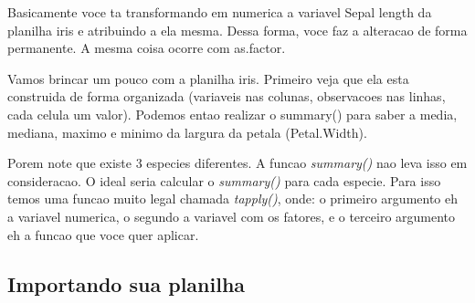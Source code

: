 \documentclass[
]{book}
\newenvironment{Shaded}{\begin{snugshade}}{\end{snugshade}}
\newcommand{\CommentTok}[1]{\textcolor[rgb]{0.56,0.35,0.01}{\textit{#1}}}
\newcommand{\FunctionTok}[1]{\textcolor[rgb]{0.13,0.29,0.53}{\textbf{#1}}}
\newcommand{\NormalTok}[1]{#1}
\newcommand{\OtherTok}[1]{\textcolor[rgb]{0.56,0.35,0.01}{#1}}
\newcommand{\SpecialCharTok}[1]{\textcolor[rgb]{0.81,0.36,0.00}{\textbf{#1}}}
\begin{document}
\begin{Shaded}
\end{Shaded}

Basicamente voce ta transformando em numerica a variavel Sepal length da planilha iris e atribuindo a ela mesma. Dessa forma, voce faz a alteracao de forma permanente. A mesma coisa ocorre com as.factor.

Vamos brincar um pouco com a planilha iris. Primeiro veja que ela esta construida de forma organizada (variaveis nas colunas, observacoes nas linhas, cada celula um valor). Podemos entao realizar o summary() para saber a media, mediana, maximo e minimo da largura da petala (Petal.Width).

\begin{Shaded}
\end{Shaded}

Porem note que existe 3 especies diferentes. A funcao \emph{summary()} nao leva isso em consideracao. O ideal seria calcular o \emph{summary()} para cada especie. Para isso temos uma funcao muito legal chamada \emph{tapply()}, onde: o primeiro argumento eh a variavel numerica, o segundo a variavel com os fatores, e o terceiro argumento eh a funcao que voce quer aplicar.

\begin{Shaded}
\end{Shaded}

\hypertarget{importando-sua-planilha}{%
\subsection{Importando sua planilha}\label{importando-sua-planilha}}
\end{document}
